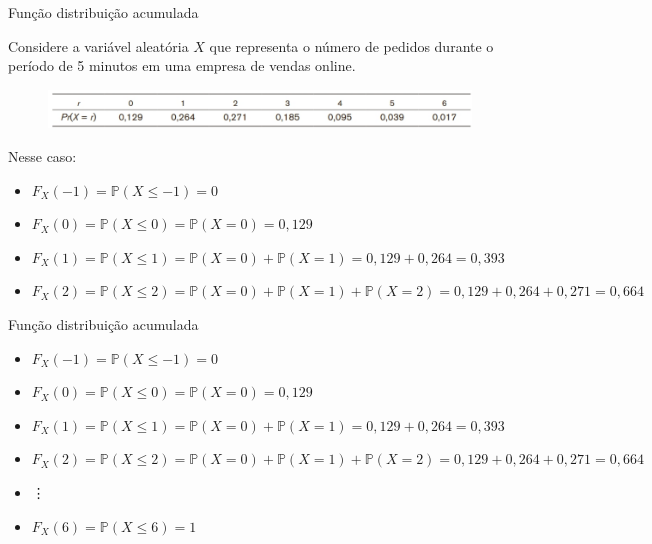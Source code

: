 \begin{frame}{Função distribuição acumulada}
    \begin{exemplo}[12]
        Considere a variável aleatória $X$ que representa o número de pedidos durante o período de 5 minutos em uma empresa de vendas online.

        \begin{figure}
            \centering
            \includegraphics[width=1\linewidth]{figures/exemplo_otite.png}
        \end{figure}
        Nesse caso:
        \pause
        \begin{itemize}
            \item $F_X(-1) = \mathds{P}(X \leq -1) = 0$
            \item $F_X(0) = \mathds{P}(X \leq 0) = \mathds{P}(X=0) = 0,129$
            \item $F_X(1) = \mathds{P}(X \leq 1) = \mathds{P}(X=0) + \mathds{P}(X=1) = 0,129 + 0,264 = 0,393$\\
            \item $F_X(2) = \mathds{P}(X \leq 2) = \mathds{P}(X=0) + \mathds{P}(X=1) + \mathds{P}(X=2) = 0,129 + 0,264 + 0,271 = 0,664 $
        \end{itemize}
    \end{exemplo}
\end{frame}

\begin{frame}{Função distribuição acumulada}
            \begin{itemize}
            \item $F_X(-1) = \mathds{P}(X \leq -1) = 0$
            \item $F_X(0) = \mathds{P}(X \leq 0) = \mathds{P}(X=0) = 0,129$
            \item $F_X(1) = \mathds{P}(X \leq 1) = \mathds{P}(X=0) + \mathds{P}(X=1) = 0,129 + 0,264 = 0,393$\\
            \item $F_X(2) = \mathds{P}(X \leq 2) = \mathds{P}(X=0) + \mathds{P}(X=1) + \mathds{P}(X=2) = 0,129 + 0,264 + 0,271 = 0,664 $
            \item \vdots
            \item $F_X(6) = \mathds{P}(X \leq 6)=1$
        \end{itemize}
\end{frame}

